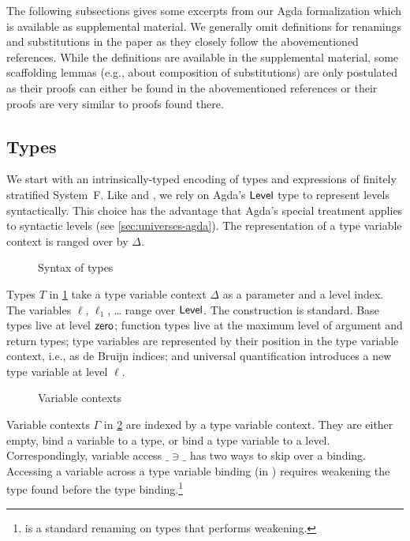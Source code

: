 \documentclass[manuscript,screen,review,anonymous]{acmart}
\begin{document}
The following subsections gives some excerpts from our Agda
formalization which is available as supplemental material. We
generally omit definitions for renamings and substitutions in the
paper as they closely follow the abovementioned references. While the
definitions are available in the supplemental material, some
scaffolding lemmas (e.g., about composition of substitutions) are only
postulated as their proofs can either be found in the abovementioned
references or their proofs are very similar to proofs found there. 

\subsection{Types}
\label{sec:syntax-types}

We start with an intrinsically-typed encoding of types and expressions
of finitely stratified System~F. Like
\citet{DBLP:conf/tyde/Saffrich0W24} and
\citet{DBLP:journals/pacmpl/HubersM23}, we rely on Agda's $\ALevel$
type to represent levels syntactically. This choice has the advantage
that Agda's special treatment applies to syntactic levels (see
\ref{sec:universes-agda}). The representation of a type variable
context is {\SFTEnv} ranged over by $\Delta$.

\begin{figure}[tp]
  \SFType
  \caption{Syntax of types}
  \label{fig:native-type-syntax}
\end{figure}
Types $T$ in \cref{fig:native-type-syntax} take a type variable
context $\Delta$ as a parameter and a level 
index. The variables $\ell$, $\ell_1$, \dots{} range over
$\ALevel$. The construction is standard. Base types live at level
$\ASetzero$; function types live at the maximum level of argument and
return types; type variables are
represented by their position in the type variable context, i.e.,
as de Bruijn indices; and
universal quantification introduces a new type variable at level $\ell$.

\begin{figure}[tp]
  \begin{minipage}{0.45\linewidth}
    \SFEEnv
  \end{minipage}
  \begin{minipage}{0.45\linewidth}
    \SFEEnvNi
  \end{minipage}
  \caption{Variable contexts}
  \label{fig:native-variable-contexts}
\end{figure}
Variable contexts $\Gamma$ in \cref{fig:native-variable-contexts} are indexed by a type variable context. They
are either empty, bind a variable to a type, or bind a type variable
to a level. Correspondingly, variable access $\_\ni\_$ has two ways to
skip over a binding. Accessing a variable across a type variable
binding (in \Atskip) requires weakening the type found before the type
binding.\footnote{{\ATwk} is a standard renaming on types that
  performs weakening.}
\end{document}
